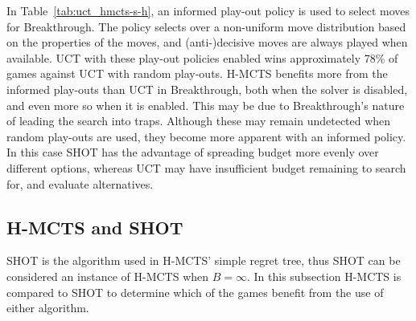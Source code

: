 \documentclass{kecsmstr}
\begin{document}
In Table~\ref{tab:uct_hmcts-s-h}, an informed play-out policy is used to select moves for Breakthrough. The policy selects over a non-uniform move distribution based on the properties of the moves, and (anti-)decisive moves are always played when available. UCT with these play-out policies enabled wins approximately 78\% of games against UCT with random play-outs. H-MCTS benefits more from the informed play-outs than UCT in Breakthrough, both when the solver is disabled, and even more so when it is enabled. This may be due to Breakthrough's nature of leading the search into traps. Although these may remain undetected when random play-outs are used, they become more apparent with an informed policy. In this case SHOT has the advantage of spreading budget more evenly over different options, whereas UCT may have insufficient budget remaining to search for, and evaluate alternatives.

\subsection{H-MCTS and SHOT}

SHOT is the algorithm used in H-MCTS' simple regret tree, thus SHOT can be considered an instance of H-MCTS when $B = \infty$. In this subsection H-MCTS is compared to SHOT to determine which of the games benefit from the use of either algorithm.

\begin{table}[ht]
\centering
\tabcolsep=0.45cm
\vspace{3mm}
{\caption{SHOT vs. UCT with random play-outs, 1,000 games} \label{tab:uct_shot}}
\end{table}
\end{document}
